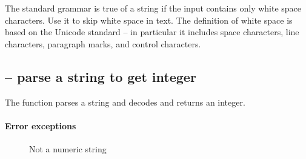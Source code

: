The  standard grammar is true of a string if the input contains only white space characters. Use it to skip white space in text. The definition of white space is based on the Unicode standard -- in particular it includes space characters, line characters, paragraph marks, and control characters.

\subsection{ -- parse a string to get integer}
\label{stdparse:str2integer}

The  function parses a string and decodes and returns an integer.

\paragraph{Error exceptions}
\begin{description}
\item[]
Not a numeric string
\end{description}

